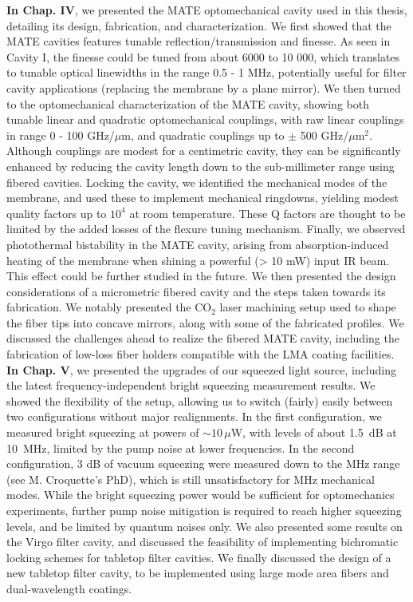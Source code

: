 \noindent \textbf{In Chap. IV}, we presented the MATE optomechanical cavity used in this thesis, detailing its design, fabrication, and characterization. We first showed that the MATE cavities features tunable reflection/transmission and finesse. As seen in Cavity I, the finesse could be tuned from about 6000 to 10 000, which translates to tunable optical linewidths in the range 0.5 - 1 MHz, potentially useful for filter cavity applications (replacing the membrane by a plane mirror). We then turned to the optomechanical characterization of the MATE cavity, showing both tunable linear and quadratic optomechanical couplings, with raw linear couplings in range 0 - 100 GHz/$\mu$m, and quadratic couplings up to $\pm$ 500 GHz/$\mu$m$^2$. Although couplings are modest for a centimetric cavity, they can be significantly enhanced by reducing the cavity length down to the sub-millimeter range using fibered cavities. Locking the cavity, we identified the mechanical modes of the membrane, and used these to implement mechanical ringdowns, yielding modest quality factors up to $10^4$ at room temperature. These Q factors are thought to be limited by the added losses of the flexure tuning mechanism. Finally, we observed photothermal bistability in the MATE cavity, arising from absorption-induced heating of the membrane when shining a powerful (> 10 mW) input IR beam. This effect could be further studied in the future. We then presented the design considerations of a micrometric fibered cavity and the steps taken towards its fabrication. We notably presented the CO$_2$ laser machining setup used to shape the fiber tips into concave mirrors, along with some of the fabricated profiles. We discussed the challenges ahead to realize the fibered MATE cavity, including the fabrication of low-loss fiber holders compatible with the LMA coating facilities. \\

\noindent \textbf{In Chap. V}, we presented the upgrades of our squeezed light source, including the latest frequency-independent bright squeezing measurement results. We showed the flexibility of the setup, allowing us to switch (fairly) easily between two configurations without major realignments. In the first configuration, we measured bright squeezing at powers of $\sim 10\,\mu$W, with levels of about 1.5~dB at 10~MHz, limited by the pump noise at lower frequencies. In the second configuration, 3 dB of vacuum squeezing were measured down to the MHz range (see M. Croquette's PhD), which is still unsatisfactory for MHz mechanical modes. While the bright squeezing power would be sufficient for optomechanics experiments, further pump noise mitigation is required to reach higher squeezing levels, and be limited by quantum noises only. We also presented some results on the Virgo filter cavity, and discussed the feasibility of implementing bichromatic locking schemes for tabletop filter cavities. We finally discussed the design of a new tabletop filter cavity, to be implemented using large mode area fibers and dual-wavelength coatings.

